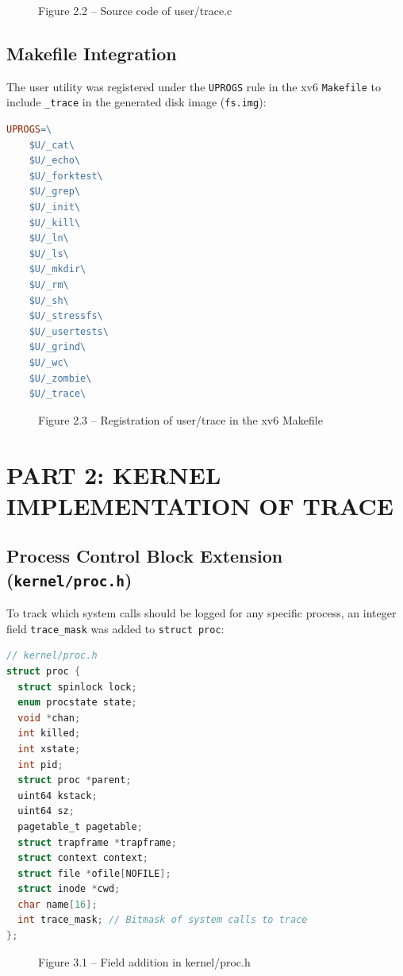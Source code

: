 \documentclass[12pt,a4paper]{report}
\numberwithin{equation}{chapter}
\numberwithin{figure}{chapter}
\numberwithin{table}{chapter}
\begin{document}
\begin{figure}[H]
\centering
\caption{Figure 2.2 -- Source code of user/trace.c}
\end{figure}

\section{Makefile Integration}
The user utility was registered under the \texttt{UPROGS} rule in the xv6 \texttt{Makefile} to include \texttt{\_trace} in the generated disk image (\texttt{fs.img}):

\begin{lstlisting}[language=make]
UPROGS=\
    $U/_cat\
    $U/_echo\
    $U/_forktest\
    $U/_grep\
    $U/_init\
    $U/_kill\
    $U/_ln\
    $U/_ls\
    $U/_mkdir\
    $U/_rm\
    $U/_sh\
    $U/_stressfs\
    $U/_usertests\
    $U/_grind\
    $U/_wc\
    $U/_zombie\
    $U/_trace\
\end{lstlisting}

\begin{figure}[H]
\centering
\caption{Figure 2.3 -- Registration of user/trace in the xv6 Makefile}
\end{figure}

\chapter{PART 2: KERNEL IMPLEMENTATION OF TRACE}

\section{Process Control Block Extension (\texttt{kernel/proc.h})}
To track which system calls should be logged for any specific process, an integer field \texttt{trace\_mask} was added to \texttt{struct proc}:

\begin{lstlisting}[language=C]
// kernel/proc.h
struct proc {
  struct spinlock lock;
  enum procstate state;
  void *chan;
  int killed;
  int xstate;
  int pid;
  struct proc *parent;
  uint64 kstack;
  uint64 sz;
  pagetable_t pagetable;
  struct trapframe *trapframe;
  struct context context;
  struct file *ofile[NOFILE];
  struct inode *cwd;
  char name[16];
  int trace_mask; // Bitmask of system calls to trace
};
\end{lstlisting}

\begin{figure}[H]
\centering
\caption{Figure 3.1 -- Field addition in kernel/proc.h}
\end{figure}
\end{document}
